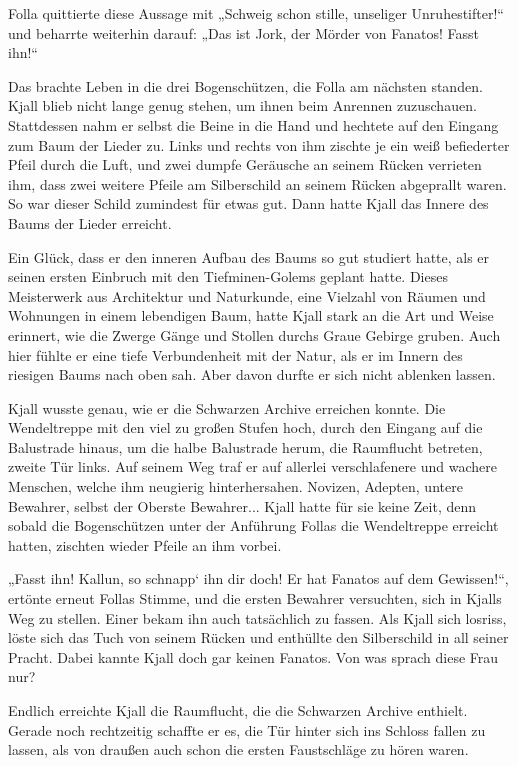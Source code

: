 Folla quittierte diese Aussage mit „Schweig schon stille, unseliger Unruhestifter!“ und beharrte weiterhin darauf: „Das ist Jork, der Mörder von Fanatos! Fasst ihn!“

Das brachte Leben in die drei Bogenschützen, die Folla am nächsten standen. Kjall blieb nicht lange genug stehen, um ihnen beim Anrennen zuzuschauen. Stattdessen nahm er selbst die Beine in die Hand und hechtete auf den Eingang zum Baum der Lieder zu. Links und rechts von ihm zischte je ein weiß befiederter Pfeil durch die Luft, und zwei dumpfe Geräusche an seinem Rücken verrieten ihm, dass zwei weitere Pfeile am Silberschild an seinem Rücken abgeprallt waren. So war dieser Schild zumindest für etwas gut. Dann hatte Kjall das Innere des Baums der Lieder erreicht.

Ein Glück, dass er den inneren Aufbau des Baums so gut studiert hatte, als er seinen ersten Einbruch mit den Tiefminen-Golems geplant hatte. Dieses Meisterwerk aus Architektur und Naturkunde, eine Vielzahl von Räumen und Wohnungen in einem lebendigen Baum, hatte Kjall stark an die Art und Weise erinnert, wie die Zwerge Gänge und Stollen durchs Graue Gebirge gruben. Auch hier fühlte er eine tiefe Verbundenheit mit der Natur, als er im Innern des riesigen Baums nach oben sah. Aber davon durfte er sich nicht ablenken lassen.

Kjall wusste genau, wie er die Schwarzen Archive erreichen konnte. Die Wendeltreppe mit den viel zu großen Stufen hoch, durch den Eingang auf die Balustrade hinaus, um die halbe Balustrade herum, die Raumflucht betreten, zweite Tür links. Auf seinem Weg traf er auf allerlei verschlafenere und wachere Menschen, welche ihm neugierig hinterhersahen. Novizen, Adepten, untere Bewahrer, selbst der Oberste Bewahrer... Kjall hatte für sie keine Zeit, denn sobald die Bogenschützen unter der Anführung Follas die Wendeltreppe erreicht hatten, zischten wieder Pfeile an ihm vorbei.

„Fasst ihn! Kallun, so schnapp‘ ihn dir doch! Er hat Fanatos auf dem Gewissen!“, ertönte erneut Follas Stimme, und die ersten Bewahrer versuchten, sich in Kjalls Weg zu stellen. Einer bekam ihn auch tatsächlich zu fassen. Als Kjall sich losriss, löste sich das Tuch von seinem Rücken und enthüllte den Silberschild in all seiner Pracht. Dabei kannte Kjall doch gar keinen Fanatos. Von was sprach diese Frau nur?

Endlich erreichte Kjall die Raumflucht, die die Schwarzen Archive enthielt. Gerade noch rechtzeitig schaffte er es, die Tür hinter sich ins Schloss fallen zu lassen, als von draußen auch schon die ersten Faustschläge zu hören waren.

